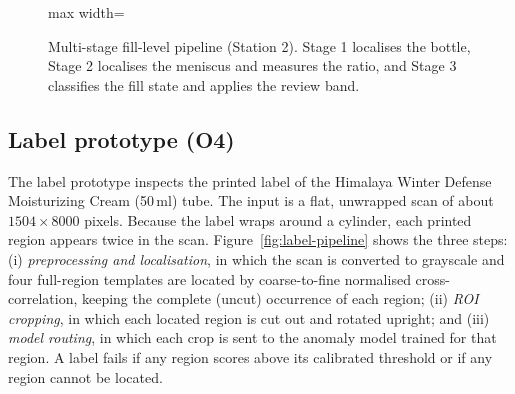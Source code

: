 \begin{figure}[htbp]
\centering
\begin{adjustbox}{max width=\textwidth}
\end{adjustbox}
\caption[Multi-stage fill-level pipeline (Station 2)]{Multi-stage fill-level pipeline (Station 2). Stage 1 localises the bottle, Stage 2 localises the meniscus and measures the ratio, and Stage 3 classifies the fill state and applies the review band.}
\label{fig:fill-pipeline}
\end{figure}

\subsection{Label prototype (O4)}
The label prototype inspects the printed label of the Himalaya Winter Defense Moisturizing Cream (50\,ml) tube. The input is a flat, unwrapped scan of about $1504{\times}8000$ pixels. Because the label wraps around a cylinder, each printed region appears twice in the scan. Figure~\ref{fig:label-pipeline} shows the three steps: (i) \emph{preprocessing and localisation}, in which the scan is converted to grayscale and four full-region templates are located by coarse-to-fine normalised cross-correlation, keeping the complete (uncut) occurrence of each region; (ii) \emph{ROI cropping}, in which each located region is cut out and rotated upright; and (iii) \emph{model routing}, in which each crop is sent to the anomaly model trained for that region. A label fails if any region scores above its calibrated threshold or if any region cannot be located.

